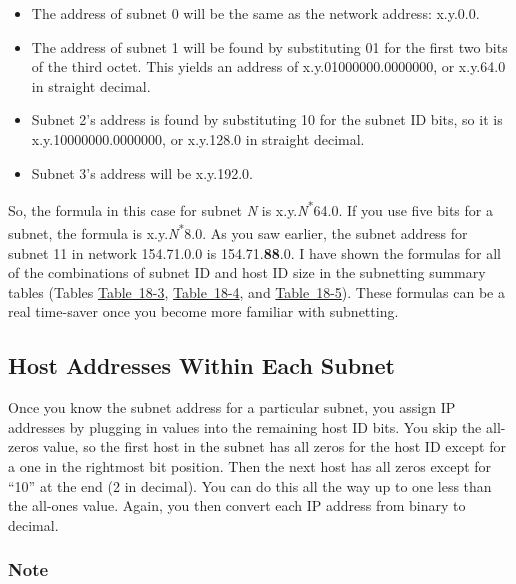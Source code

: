 \begin{itemize}
\item
  The address of subnet 0 will be the same as the network address:
  x.y.0.0.
\item
  The address of subnet 1 will be found by substituting 01 for the first
  two bits of the third octet. This yields an address of
  x.y.01000000.0000000, or x.y.64.0 in straight decimal.
\item
  Subnet 2's address is found by substituting 10 for the subnet ID bits,
  so it is x.y.10000000.0000000, or x.y.128.0 in straight decimal.
\item
  Subnet 3's address will be x.y.192.0.
\end{itemize}

So, the formula in this case for subnet {\emph{N}} is
x.y.{\emph{N}}\textsuperscript{*}64.0. If you use five bits for a
subnet, the formula is x.y.{\emph{N}}\textsuperscript{*}8.0. As you saw
earlier, the subnet address for subnet 11 in network 154.71.0.0 is
154.71.{\textbf{88}}.0. I have shown the formulas for all of the
combinations of subnet ID and host ID size in the subnetting summary
tables (Tables
\protect\hyperlink{ch18s07.htmlux5cux23subnetting_summary_table_for_class_a_net}{Table~18-3},
\protect\hyperlink{ch18s07.htmlux5cux23subnetting_summary_table_for_class_b_net}{Table~18-4},
and
\protect\hyperlink{ch18s07.htmlux5cux23subnetting_summary_table_for_class_c_net}{Table~18-5}).
These formulas can be a real time-saver once you become more familiar
with subnetting.

\subsection[Host Addresses Within Each
Subnet]{\texorpdfstring{\protect\hypertarget{ch18s06.htmlux5cux23host_addresses_within_each_subnet}{}{}Host
Addresses Within Each Subnet}{Host Addresses Within Each Subnet}}

Once you know the subnet address for a particular subnet, you assign IP
addresses by plugging in values into the remaining host ID bits. You
skip the all-zeros value, so the first host in the subnet has all zeros
for the host ID except for a one in the rightmost bit position. Then the
next host has all zeros except for ``10'' at the end (2 in decimal). You
can do this all the way up to one less than the all-ones value. Again,
you then convert each IP address from binary to decimal.

\subsubsection[Note]{\texorpdfstring{\protect\hypertarget{ch18s06.htmlux5cux23note-74}{}{}Note}{Note}}

